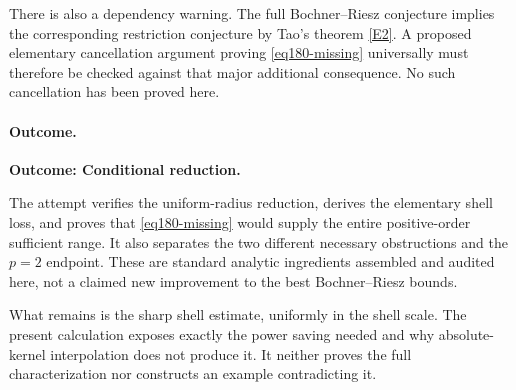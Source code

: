 \documentclass[11pt,a4paper]{article}
\newcommand{\eref}[2]{\hyperlink{extra:#1:#2}{[E#2]}}
\numberwithin{equation}{section}
\begin{document}
There is also a dependency warning. The full Bochner--Riesz conjecture
implies the corresponding restriction conjecture by Tao's theorem
\eref{180}{2}. A proposed elementary cancellation argument proving
\eqref{eq180-missing} universally must therefore be checked against that
major additional consequence. No such cancellation has been proved here.

\paragraph{Outcome.}
\textbf{Outcome: Conditional reduction.}

The attempt verifies the uniform-radius reduction, derives the elementary
shell loss, and proves that \eqref{eq180-missing} would supply the entire
positive-order sufficient range. It also separates the two different
necessary obstructions and the $p=2$ endpoint. These are standard analytic
ingredients assembled and audited here, not a claimed new improvement to
the best Bochner--Riesz bounds.

What remains is the sharp shell estimate, uniformly in the shell scale.
The present calculation exposes exactly the power saving needed and why
absolute-kernel interpolation does not produce it. It neither proves the
full characterization nor constructs an example contradicting it.
\end{document}
